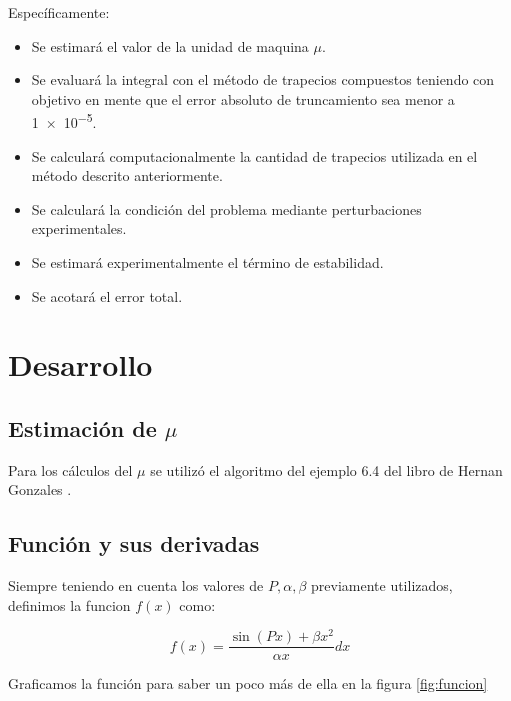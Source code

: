 \documentclass[11pt,a4paper]{article}
\begin{document}
Específicamente:

\begin{itemize}
\item Se estimará el valor de la unidad de maquina \( \mu \).
\item Se evaluará la integral con el método de trapecios compuestos teniendo con objetivo en mente que el error absoluto de truncamiento sea menor a \num{1e-5}.
\item Se calculará computacionalmente la cantidad de trapecios utilizada en el método descrito anteriormente.
\item Se calculará la condición del problema mediante perturbaciones experimentales.
\item Se estimará experimentalmente el término de estabilidad.
\item Se acotará el error total.
\end{itemize}

\section{Desarrollo}

\subsection{Estimación de \( \mu \) }

Para los cálculos del \( \mu \) se utilizó el algoritmo del ejemplo 6.4 del libro de Hernan Gonzales \cite{Gonzales}.

\subsection{Función y sus derivadas}

Siempre teniendo en cuenta los valores de \(P, \alpha, \beta \) previamente utilizados, definimos la funcion \( f(x) \) como:

\[ f(x) = \frac{\sin{(P x)}  + \beta x^2}{\alpha x} dx \]

Graficamos la función para saber un poco más de ella en la figura \ref{fig:funcion}
\end{document}
